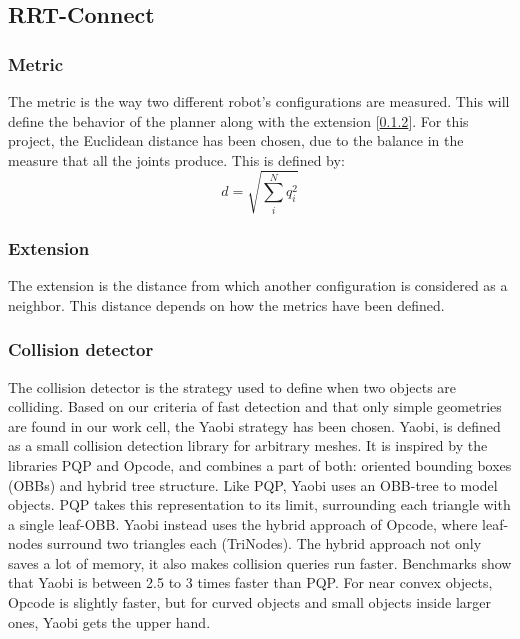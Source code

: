 	\subsection{RRT-Connect} %
	\label{sub:rrt_connect_implementation}
	\subsubsection{Metric} %
	\label{sub:metric}
	The metric is the way two different robot's configurations are measured. This will define the behavior of the planner along with the extension [\ref{sub:extension}]. For this project, the Euclidean distance has been chosen, due to the balance in the measure that all the joints produce. This is defined by:
	\begin{equation}
		d=\sqrt{\sum_i^N q_i^2}
	\end{equation}

	\subsubsection{Extension} %
	\label{sub:extension}
	The extension is the distance from which another configuration is considered as a neighbor. This distance depends on how the metrics have been defined.

	\subsubsection{Collision detector} %
	\label{sub:collision_detector}
	The collision detector is the strategy used to define when two objects are colliding. Based on our criteria of fast detection and that only simple geometries are found in our work cell, the Yaobi strategy \cite{Yaobi} has been chosen. Yaobi, is defined as a small collision detection library for arbitrary meshes. It is inspired by the libraries PQP and Opcode, and combines a part of both: oriented bounding boxes (OBBs) and hybrid tree structure. Like PQP, Yaobi uses an OBB-tree to model objects. PQP takes this representation to its limit, surrounding each triangle with a single leaf-OBB. Yaobi instead uses the hybrid approach of Opcode, where leaf-nodes surround two triangles each (TriNodes). The hybrid approach not only saves a lot of memory, it also makes collision queries run faster. Benchmarks show that Yaobi is between 2.5 to 3 times faster than PQP. For near convex objects, Opcode is slightly faster, but for curved objects and small objects inside larger ones, Yaobi gets the upper hand.
